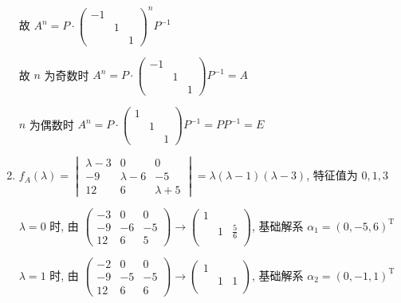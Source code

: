 \begin{enumerate}
			       故 \( A^{n} = P\cdot\begin{pmatrix}
				       -1 &   &   \\
				          & 1 &   \\
				          &   & 1
			       \end{pmatrix}^{n}P^{-1} \)

			       故 \( n \) 为奇数时 \( A^{n} = P\cdot\begin{pmatrix}
				       -1 &   &   \\
				          & 1 &   \\
				          &   & 1
			       \end{pmatrix}P^{-1} = A \)

			       \( n \) 为偶数时 \( A^{n} = P\cdot\begin{pmatrix}
				       1 &   &   \\
				         & 1 &   \\
				         &   & 1
			       \end{pmatrix}P^{-1} = PP^{-1} = E \)
			 \item %
			       \( f_{A}(\lambda) = \begin{vmatrix}
				       \lambda - 3 & 0           & 0           \\
				       -9          & \lambda - 6 & -5          \\
				       12          & 6           & \lambda + 5
			       \end{vmatrix} = \lambda(\lambda - 1)(\lambda - 3) \), 特征值为 \( 0, 1, 3 \)

			       \( \lambda = 0 \) 时, 由 \( \begin{pmatrix}
				       -3 & 0  & 0  \\
				       -9 & -6 & -5 \\
				       12 & 6  & 5
			       \end{pmatrix} \rightarrow \begin{pmatrix}
				       1 &   &             \\
				         & 1 & \frac{5}{6} \\
				         &   &
			       \end{pmatrix} \), 基础解系 \( \alpha_{1} = (0, -5, 6)^{\mathrm{T}} \)

			       \( \lambda = 1 \) 时, 由 \( \begin{pmatrix}
				       -2 & 0  & 0  \\
				       -9 & -5 & -5 \\
				       12 & 6  & 6
			       \end{pmatrix} \rightarrow \begin{pmatrix}
				       1 &   &   \\
				         & 1 & 1 \\
				         &   &
			       \end{pmatrix} \), 基础解系 \( \alpha_{2} = (0, -1, 1)^{\mathrm{T}} \)


\end{enumerate}
